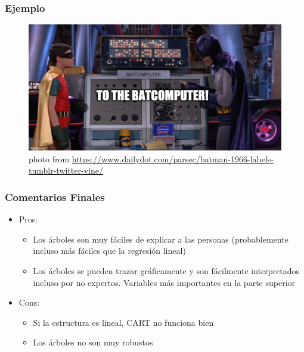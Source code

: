 \documentclass[
  shownotes,
  xcolor={svgnames},
  hyperref={colorlinks,citecolor=DarkBlue,linkcolor=andesred,urlcolor=DarkBlue}
  , aspectratio=169]{beamer}
\begin{document}
\begin{frame}[fragile]
\frametitle{Ejemplo}
\begin{figure}[H] \centering
  \centering
  \includegraphics[scale=0.35]{figures/baticomputer_meme.jpg}
  \\
  \tiny photo from \url{https://www.dailydot.com/parsec/batman-1966-labels-tumblr-twitter-vine/}
\end{figure}

\end{frame}


\begin{frame}[fragile]
\frametitle{Comentarios Finales}

\begin{itemize}
\item Pros: 
  \begin{itemize}
    \item Los árboles son muy fáciles de explicar a las personas (probablemente incluso más fáciles que la regresión lineal)
    \medskip
    \item Los árboles se pueden trazar gráficamente y son fácilmente interpretados incluso por no expertos. Variables más importantes en la parte superior
  \end{itemize}

\bigskip
\item  Cons:
  \begin{itemize}
    
    \item Si la estructura es lineal, CART no funciona bien
    \medskip
    \item Los árboles no son muy robustos 
    
  \end{itemize}
\end{itemize}

\end{frame}

\end{document}
